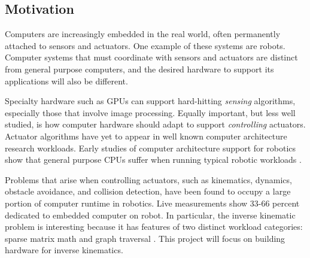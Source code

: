 \subsection{Motivation}

Computers are increasingly embedded in the real world, often permanently attached to sensors and actuators. One example of these systems are robots. Computer systems that must coordinate with sensors and actuators are distinct from general purpose computers, and the desired hardware to support its applications will also be different.

Specialty hardware such as GPUs can support hard-hitting \emph{sensing} algorithms, especially those that involve image processing. Equally important, but less well studied, is how computer hardware should adapt to support \emph{controlling} actuators. Actuator algorithms have yet to appear in well known computer architecture research workloads. Early studies of computer architecture support for robotics show that general purpose CPUs suffer when running typical robotic workloads \cite{Caselli}.

Problems that arise when controlling actuators, such as kinematics, dynamics, obstacle avoidance, and collision detection, have been found to occupy a large portion of computer runtime in robotics. Live measurements show 33-66 percent dedicated to embedded computer on robot. In particular, the inverse kinematic problem is interesting because it has features of two distinct workload categories: sparse matrix math and graph traversal \cite{dwarfs}. This project will focus on building hardware for inverse kinematics.

